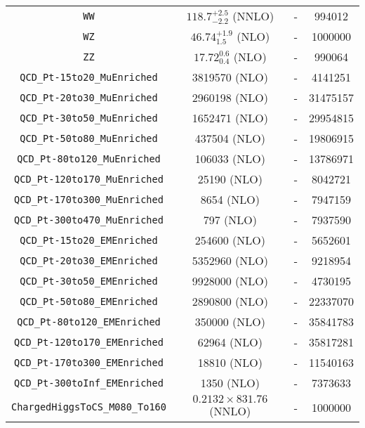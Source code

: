 \begin{table}
\begin{center}
\begin{tabular}{cccc}
    \verb|WW|  &$118.7^{+2.5}_{-2.2}$ (NNLO) & -   & 994012  \\ 
    \verb|WZ|  &$46.74^{+1.9}_{1.5}$ (NLO)  & -  & 1000000 \\ 
    \verb|ZZ|  &$17.72^{0.6}_{0.4}$ (NLO)  & -  & 990064  \\ \hline
    \verb|QCD_Pt-15to20_MuEnriched|    & 3819570 (NLO) & -  & 4141251   \\
    \verb|QCD_Pt-20to30_MuEnriched|    & 2960198 (NLO) & -  & 31475157  \\
    \verb|QCD_Pt-30to50_MuEnriched|    & 1652471 (NLO) & -  & 29954815  \\
    \verb|QCD_Pt-50to80_MuEnriched|    & 437504  (NLO) & -  & 19806915  \\
    \verb|QCD_Pt-80to120_MuEnriched|   & 106033  (NLO) & -  & 13786971  \\
    \verb|QCD_Pt-120to170_MuEnriched|  & 25190   (NLO) & -  & 8042721   \\
    \verb|QCD_Pt-170to300_MuEnriched|  & 8654    (NLO) & -  & 7947159   \\
    \verb|QCD_Pt-300to470_MuEnriched|  & 797     (NLO) & -  & 7937590   \\\hline
    
    \verb|QCD_Pt-15to20_EMEnriched|      & 254600  (NLO) & -  & 5652601    \\
    \verb|QCD_Pt-20to30_EMEnriched|      & 5352960 (NLO) & -  & 9218954    \\
    \verb|QCD_Pt-30to50_EMEnriched|      & 9928000 (NLO) & -  & 4730195    \\
    \verb|QCD_Pt-50to80_EMEnriched|      & 2890800 (NLO) & -  & 22337070   \\
    \verb|QCD_Pt-80to120_EMEnriched|     & 350000  (NLO) & -  & 35841783   \\
    \verb|QCD_Pt-120to170_EMEnriched|    & 62964   (NLO) & -  & 35817281   \\
    \verb|QCD_Pt-170to300_EMEnriched|    & 18810   (NLO) & -  & 11540163   \\
    \verb|QCD_Pt-300toInf_EMEnriched|    & 1350    (NLO) & -  & 7373633    \\\hline
    \verb|ChargedHiggsToCS_M080_To160|  & $0.2132 \times 831.76$ (NNLO) & - &1000000   
    \\\hline
\end{tabular}
\end{center}
\end{table}

